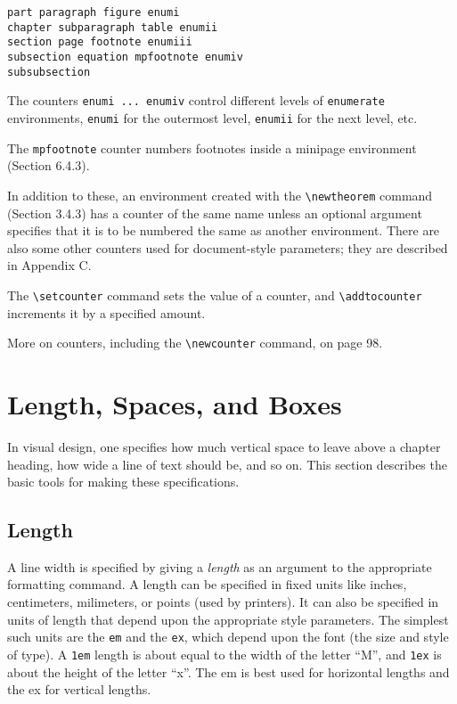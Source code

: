 \documentclass{article}
\newcommand{\justtext}[1]{\texttt{\textbackslash #1}}
\begin{document}
\begin{verbatim}
part paragraph figure enumi
chapter subparagraph table enumii
section page footnote enumiii
subsection equation mpfootnote enumiv
subsubsection
\end{verbatim}

The counters {\tt enumi ... enumiv} control different levels of {\tt enumerate} environments, {\tt enumi} for the outermost level, {\tt enumii} for the next level, etc. 

The {\tt mpfootnote} counter numbers footnotes inside a minipage environment (Section 6.4.3). 

In addition to these, an environment created with the \justtext{newtheorem} command (Section 3.4.3) has a counter of the same name unless an optional argument specifies that it is to be numbered the same as another environment. There are also some other counters used for document-style parameters; they are described in Appendix C.

The \justtext{setcounter} command sets the value of a counter, and \justtext{addtocounter} increments it by a specified amount. 

More on counters, including the \justtext{newcounter} command, on page 98.


\section{Length, Spaces, and Boxes}

In visual design, one specifies how much vertical space to leave above a chapter heading, how wide a
line of text should be, and so on. This section describes the basic tools for making these
specifications.

\subsection{Length}

A line width is specified by giving a \emph{length} as an argument to the appropriate formatting command. A length can be specified in fixed units like inches, centimeters, milimeters, or points (used by printers). It can also be specified in units of length that depend upon the appropriate style parameters. The simplest such units are the {\tt em} and the {\tt ex}, which depend upon the font (the size and style of type). A {\tt 1em} length is about equal to the width of the letter ``M'', and {\tt 1ex} is about the height of the letter ``x''. The em is best used for horizontal lengths and the ex for vertical lengths.
\end{document}
